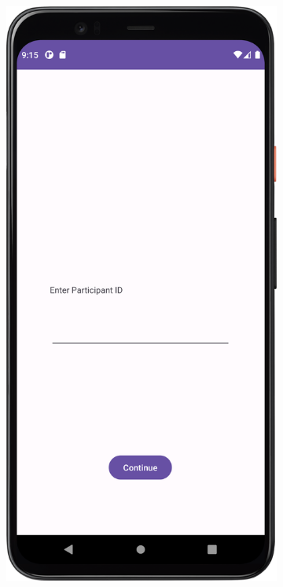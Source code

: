 \begin{figure}[htbp]
\begin{subfigure}[b]{0.25\textwidth}
        \label{subfig:chooseTestSubject2}
    \end{subfigure}
    \hspace{1cm}
    \begin{subfigure}[b]{0.25\textwidth}
        \centering
        \includegraphics[width=\textwidth]{content/06_demonstration_of_the_artifact/Screenshot_ParticipantSelectionScreen.png}

\end{subfigure}
\end{figure}
